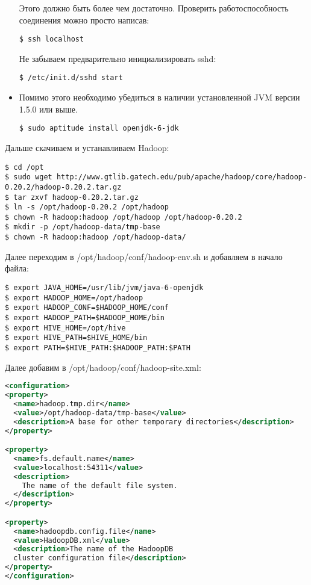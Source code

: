 \begin{itemize}
  Этого должно быть более чем достаточно. Проверить работоспособность соединения можно просто написав:

  \begin{lstlisting}[label=lst:haddop5,caption=Пробуем зайти на ssh без пароля]
  $ ssh localhost
  \end{lstlisting}

  Не забываем предварительно инициализировать sshd:

  \begin{lstlisting}[label=lst:haddop6,caption=Запуск sshd]
  $ /etc/init.d/sshd start
  \end{lstlisting}

  \item Помимо этого необходимо убедиться в наличии установленной JVM версии 1.5.0 или выше.

  \begin{lstlisting}[label=lst:haddop7,caption=Устанавливаем JVM]
  $ sudo aptitude install openjdk-6-jdk
  \end{lstlisting}

\end{itemize}

Дальше скачиваем и устанавливаем Hadoop:

\begin{lstlisting}[label=lst:haddop8,caption=Устанавливаем Hadoop]
$ cd /opt
$ sudo wget http://www.gtlib.gatech.edu/pub/apache/hadoop/core/hadoop-0.20.2/hadoop-0.20.2.tar.gz
$ tar zxvf hadoop-0.20.2.tar.gz
$ ln -s /opt/hadoop-0.20.2 /opt/hadoop
$ chown -R hadoop:hadoop /opt/hadoop /opt/hadoop-0.20.2
$ mkdir -p /opt/hadoop-data/tmp-base
$ chown -R hadoop:hadoop /opt/hadoop-data/
\end{lstlisting}

Далее переходим в /opt/hadoop/conf/hadoop-env.sh и добавляем в начало файла:

\begin{lstlisting}[label=lst:haddop9,caption=Указываем переменные окружения]
$ export JAVA_HOME=/usr/lib/jvm/java-6-openjdk
$ export HADOOP_HOME=/opt/hadoop
$ export HADOOP_CONF=$HADOOP_HOME/conf
$ export HADOOP_PATH=$HADOOP_HOME/bin
$ export HIVE_HOME=/opt/hive
$ export HIVE_PATH=$HIVE_HOME/bin
$ export PATH=$HIVE_PATH:$HADOOP_PATH:$PATH
\end{lstlisting}

Далее добавим в /opt/hadoop/conf/hadoop-site.xml:

\begin{lstlisting}[language=XML,label=lst:haddop10,caption=Настройки hadoop]
<configuration>
<property>
  <name>hadoop.tmp.dir</name>
  <value>/opt/hadoop-data/tmp-base</value>
  <description>A base for other temporary directories</description>
</property>

<property>
  <name>fs.default.name</name>
  <value>localhost:54311</value>
  <description>
    The name of the default file system.
  </description>
</property>

<property>
  <name>hadoopdb.config.file</name>
  <value>HadoopDB.xml</value>
  <description>The name of the HadoopDB
  cluster configuration file</description>
</property>
</configuration>
\end{lstlisting}

